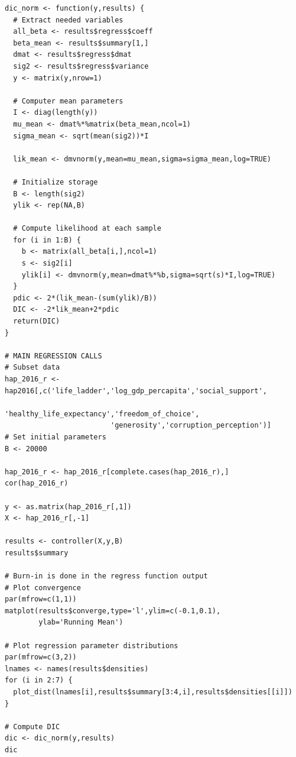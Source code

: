 \documentclass{article}
\begin{document}
\begin{verbatim}
dic_norm <- function(y,results) {
  # Extract needed variables
  all_beta <- results$regress$coeff
  beta_mean <- results$summary[1,]
  dmat <- results$regress$dmat
  sig2 <- results$regress$variance
  y <- matrix(y,nrow=1)
  
  # Computer mean parameters
  I <- diag(length(y))
  mu_mean <- dmat%*%matrix(beta_mean,ncol=1)
  sigma_mean <- sqrt(mean(sig2))*I
  
  lik_mean <- dmvnorm(y,mean=mu_mean,sigma=sigma_mean,log=TRUE)
  
  # Initialize storage
  B <- length(sig2)
  ylik <- rep(NA,B)
  
  # Compute likelihood at each sample
  for (i in 1:B) {
    b <- matrix(all_beta[i,],ncol=1)
    s <- sig2[i]
    ylik[i] <- dmvnorm(y,mean=dmat%*%b,sigma=sqrt(s)*I,log=TRUE)
  }
  pdic <- 2*(lik_mean-(sum(ylik)/B))
  DIC <- -2*lik_mean+2*pdic
  return(DIC)
}

# MAIN REGRESSION CALLS
# Subset data
hap_2016_r <- hap2016[,c('life_ladder','log_gdp_percapita','social_support',
                         'healthy_life_expectancy','freedom_of_choice',
                         'generosity','corruption_perception')]
# Set initial parameters
B <- 20000

hap_2016_r <- hap_2016_r[complete.cases(hap_2016_r),]
cor(hap_2016_r)

y <- as.matrix(hap_2016_r[,1])
X <- hap_2016_r[,-1]

results <- controller(X,y,B)
results$summary

# Burn-in is done in the regress function output
# Plot convergence
par(mfrow=c(1,1))
matplot(results$converge,type='l',ylim=c(-0.1,0.1),
        ylab='Running Mean')

# Plot regression parameter distributions
par(mfrow=c(3,2))
lnames <- names(results$densities)
for (i in 2:7) {
  plot_dist(lnames[i],results$summary[3:4,i],results$densities[[i]])
}

# Compute DIC
dic <- dic_norm(y,results)
dic



\end{verbatim}
\end{document}
